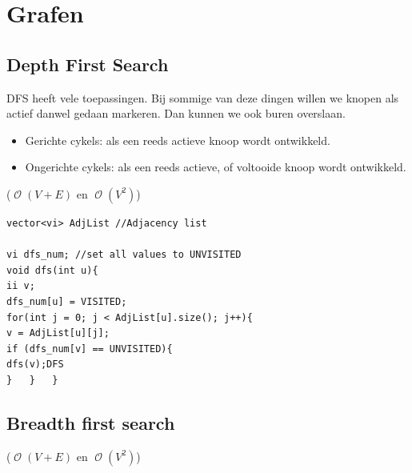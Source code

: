 \documentclass[10pt,a4paper,titlepage]{article}
\DeclareMathOperator{\bigO}{\mathcal{O}}
\begin{document}

\section{Grafen}

\subsection{Depth First Search}

DFS heeft vele toepassingen. Bij sommige van deze dingen willen we knopen als actief danwel gedaan markeren. Dan kunnen we ook buren overslaan.
\begin{itemize}[noitemsep,nolistsep]
\item Gerichte cykels: als een reeds actieve knoop wordt ontwikkeld.
\item Ongerichte cykels: als een reeds actieve, of voltooide knoop wordt ontwikkeld.
\end{itemize}

($\bigO(V+E)$ en $\bigO(V^2)$)
\begin{lstlisting}
vector<vi> AdjList //Adjacency list

vi dfs_num; //set all values to UNVISITED
void dfs(int u){
ii v;
dfs_num[u] = VISITED;
for(int j = 0; j < AdjList[u].size(); j++){
v = AdjList[u][j];
if (dfs_num[v] == UNVISITED){
dfs(v);DFS
}	}	}
\end{lstlisting}

\subsection{Breadth first search}
($\bigO(V+E)$ en $\bigO(V^2)$)
\end{document}
